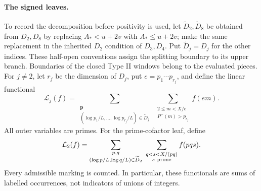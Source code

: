 \documentclass[11pt,a4paper]{article}
\theoremstyle{paperplain}
\numberwithin{equation}{section}
\begin{document}
\paragraph{The signed leaves.}
To record the decomposition before positivity is used, let
$\widetilde D_2,\widetilde D_8$ be obtained from $D_2,D_8$ by replacing
$A_*<u+2v$ with $A_*\le u+2v$; make the same replacement in the
inherited $D_2$ condition of $D_3,D_4$. Put
$\widetilde D_j=D_j$ for the other indices.
These half-open conventions assign the splitting boundary to its
upper branch. Boundaries of the closed Type II windows belong to
the evaluated pieces.
For $j\ne2$, let $r_j$ be the dimension of $D_j$, put
$e=p_1\cdots p_{r_j}$, and define the linear functional
\[
 \mathcal L_j(f)=
 \sum_{\substack{\boldsymbol p\\
       (\log p_1/L,\ldots,\log p_{r_j}/L)\in\widetilde D_j}}
 \ \sum_{\substack{2\le m<X/e\\P^-(m)>p_{r_j}}}f(em).
\]
All outer variables are primes. For the prime-cofactor leaf, define
\[
 \mathcal L_2(f)=
 \sum_{\substack{p,q\\(\log p/L,\log q/L)\in\widetilde D_2}}
       \ \sum_{\substack{q<s<X/(pq)\\s\ {\rm prime}}}f(pqs).
\]
Every admissible marking is counted. In particular, these
functionals are sums of labelled occurrences, not indicators of
unions of integers.
\end{document}
